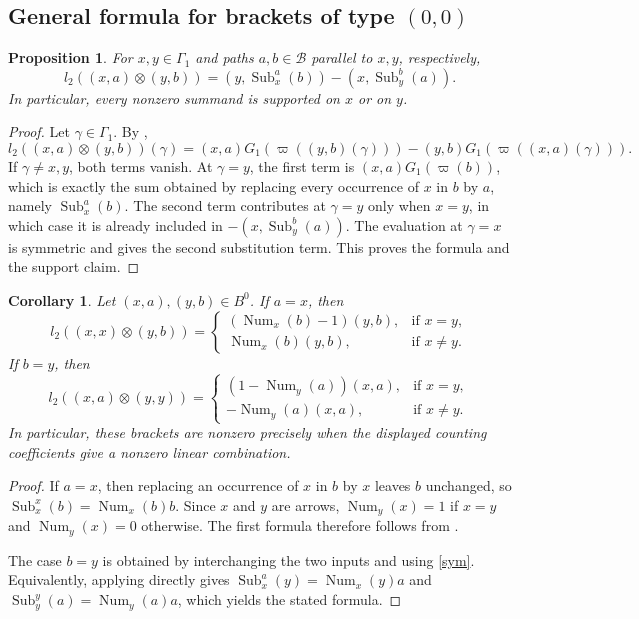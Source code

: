 \documentclass[11pt,a4paper,reqno]{amsart}
\newcommand{\mB}{\mathcal B}
\newcommand{\Sub}{\operatorname{Sub}}
\newcommand{\para}[2]{(#1,#2)}
\newcommand{\num}[2]{\operatorname{Num}_{#1}(#2)}
\theoremstyle{plain}
\newtheorem{corollary}[corollary]{Corollary}
\newtheorem{proposition}[proposition]{Proposition}
\theoremstyle{definition}
\numberwithin{equation}{section}
\begin{document}
	\subsection{General formula for brackets of type \texorpdfstring{$(0,0)$}{(0,0)}}
	
	\begin{proposition}\label{DZSF}
		For $x,y\in\Gamma_1$ and paths $a,b\in\mB$ parallel to $x,y$, respectively,
		\[
		l_2(\para{x}{a}\otimes \para{y}{b})
		=
		\para{y}{\Sub_x^a(b)}-
		\para{x}{\Sub_y^b(a)}.
		\]
		In particular, every nonzero summand is supported on $x$ or on $y$.
	\end{proposition}
	
	\begin{proof}
		Let $\gamma\in\Gamma_1$.  By ,
		\[
		l_2(\para{x}{a}\otimes \para{y}{b})(\gamma)
		=
		\para{x}{a}G_1(\varpi(\para{y}{b}(\gamma)))
		-
		\para{y}{b}G_1(\varpi(\para{x}{a}(\gamma))).
		\]
		If $\gamma\neq x,y$, both terms vanish.  At $\gamma=y$, the first term is
		$\para{x}{a}G_1(\varpi(b))$, which is exactly the sum obtained by replacing every
		occurrence of $x$ in $b$ by $a$, namely $\Sub_x^a(b)$.  The second term
		contributes at $\gamma=y$ only when $x=y$, in which case it is already included
		in $-\para{x}{\Sub_y^b(a)}$.  The evaluation at $\gamma=x$ is symmetric and
		gives the second substitution term.  This proves the formula and the support
		claim.
	\end{proof}
	
	\begin{corollary}\label{00-x-equal-to-a}
		Let $\para{x}{a},\para{y}{b}\in B^0$.  If $a=x$, then
		\[
		l_2(\para{x}{x}\otimes\para{y}{b})
		=
		\begin{cases}
			(\num{x}{b}-1)\para{y}{b}, & \text{if } x=y,\\
			\num{x}{b}\para{y}{b}, & \text{if } x\neq y.
		\end{cases}
		\]
		If $b=y$, then
		\[
		l_2(\para{x}{a}\otimes\para{y}{y})
		=
		\begin{cases}
			(1-\num{y}{a})\para{x}{a}, & \text{if } x=y,\\
			-\num{y}{a}\para{x}{a}, & \text{if } x\neq y.
		\end{cases}
		\]
		In particular, these brackets are nonzero precisely when the displayed
		counting coefficients give a nonzero linear combination.
	\end{corollary}
	
	\begin{proof}
		If $a=x$, then replacing an occurrence of $x$ in $b$ by $x$ leaves $b$
		unchanged, so $\Sub_x^x(b)=\num{x}{b}b$.  Since $x$ and $y$ are arrows,
		$\num{y}{x}=1$ if $x=y$ and $\num{y}{x}=0$ otherwise.  The first formula
		therefore follows from .
		
		The case $b=y$ is obtained by interchanging the two inputs and using
		\eqref{sym}.  Equivalently, applying  directly gives
		$\Sub_x^a(y)=\num{x}{y}a$ and $\Sub_y^y(a)=\num{y}{a}a$,
		which yields the stated formula.
	\end{proof}
	
\end{document}
